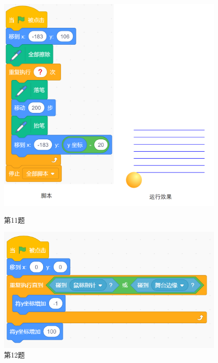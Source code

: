\documentclass[10pt, a4paper]{article}
\begin{document}
\begin{enumerate}
        \begin{figure}[htbp]
            \centering
            \begin{minipage}[t]{.25\textwidth}
                \centering
                \includegraphics[width=\textwidth]{11-1.png}
                \caption*{第11题}
            \end{minipage}
            \begin{minipage}[t]{.4\textwidth}
                \centering
                \includegraphics[width=\textwidth]{12.png}
                \caption*{第12题}
            \end{minipage}
        \end{figure}


\end{enumerate}
\end{document}
